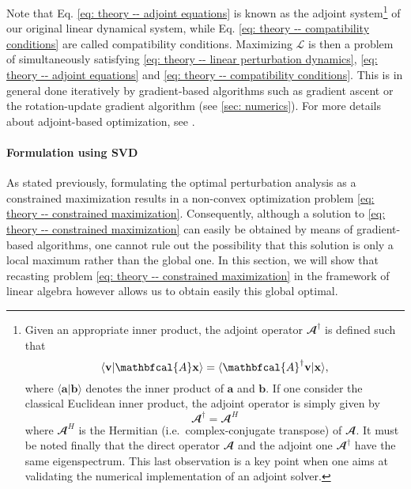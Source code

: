       Note that Eq. \eqref{eq: theory -- adjoint equations} is known as the adjoint system\footnote{
      Given an appropriate inner product, the adjoint operator $\mathbfcal{A}^{\dagger}$ is defined such that
      \begin{equation}
        \langle \mathbf{v} \vert \mathbfcal{A} \mathbf{x} \rangle = \langle \mathbfcal{A}^{\dagger} \mathbf{v} \vert \mathbf{x} \rangle,
        \notag
      \end{equation}
      where $\langle \mathbf{a} \vert \mathbf{b} \rangle$ denotes the inner product of $\mathbf{a}$ and $\mathbf{b}$. If one consider the classical Euclidean inner product, the adjoint operator is simply given by
      $$\mathbfcal{A}^{\dagger} = \mathbfcal{A}^H$$
      where $\mathbfcal{A}^H$ is the Hermitian (i.e.\ complex-conjugate transpose) of $\mathbfcal{A}$. It must be noted finally that the direct operator $\mathbfcal{A}$ and the adjoint one $\mathbfcal{A}^{\dagger}$ have the same eigenspectrum. This last observation is a key point when one aims at validating the numerical implementation of an adjoint solver.
      }
      of our original linear dynamical system, while Eq. \eqref{eq: theory -- compatibility conditions} are called compatibility conditions. Maximizing $\mathcal{L}$ is then a problem of simultaneously satisfying \eqref{eq: theory -- linear perturbation dynamics}, \eqref{eq: theory -- adjoint equations} and \eqref{eq: theory -- compatibility conditions}. This is in general done iteratively by gradient-based algorithms such as gradient ascent or the rotation-update gradient algorithm (see \textsection \ref{sec: numerics}). For more details about adjoint-based optimization, see \cite{book:boyd:2004, nonlinear_optimal:kerswell:2014}.

      \paragraph{Formulation using SVD}
      \label{paragraph: theory -- optimal perturbation svd}

      As stated previously, formulating the optimal perturbation analysis as a constrained maximization results in a non-convex optimization problem \eqref{eq: theory -- constrained maximization}. Consequently, although a solution to \eqref{eq: theory -- constrained maximization} can easily be obtained by means of gradient-based algorithms, one cannot rule out the possibility that this solution is only a local maximum rather than the global one. In this section, we will show that recasting problem \eqref{eq: theory -- constrained maximization} in the framework of linear algebra however allows us to obtain easily this global optimal.


